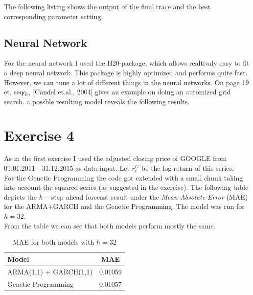\documentclass[fleqn]{article}
\begin{document}
The following listing shows the output of the final.trace and the best corresponding parameter setting. 
 


\subsection*{Neural Network}

For the neural network I used the H20-package, which allows realtivaly easy to fit a deep neural network. This package is highly optimized and performs quite fast. However, we can tune a lot of different things in the neural networks. On page 19 et. seqq., [Candel et.al., 2004] gives an example on doing an automized grid search. a possble resulting model reveals the following results.



\pagebreak

\section*{Exercise 4}

As in the first exercise I used the adjusted closing price of GOOGLE from 01.01.2011 - 31.12.2015 as data input. Let $r_t^G$ be the log-return of this series. \\
For the Genetic Programming the code got extended with a small chunk taking into account the squared series (as suggested in the exercise). The following table depicts the $h-$step ahead forecast result under the  \textit{Mean-Absolute-Error} (MAE) for the ARMA+GARCH and the Genetic Programming. The model was run for $h=32$.\\
From the table we can see that both models perform mostly the same. 

\begin{table}[!h]
	\centering
	\vspace{0.3cm}
	\begin{tabular}{l|c}
		\toprule \toprule
		\textbf{Model} & \textbf{MAE} \\ 
		\hline
		ARMA(1,1) + GARCH(1,1) & 0.01059 \\
		Genetic Programming & 0.01057 \\
		\bottomrule
	\end{tabular}\\
	\caption{MAE for both models with $h=32$}
\end{table}
\end{document}
